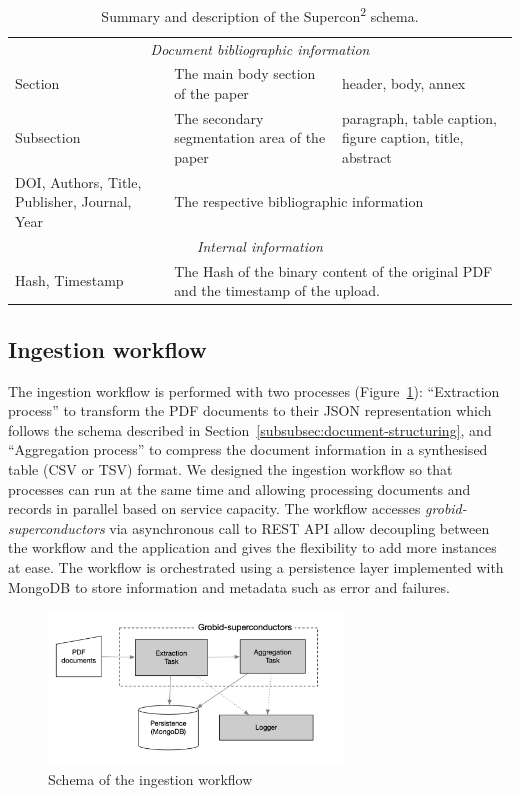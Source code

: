 \documentclass{article}
\begin{document}
\begin{table}[ht]
\begin{tabularx}{\linewidth}{p{}XX}
\multicolumn{3}{c}{\emph{Document bibliographic information}} \\
Section & The main body section of the paper& header, body, annex\\
Subsection & The secondary segmentation area of the paper& paragraph, table caption, figure caption, title, abstract \\
DOI, Authors, Title, Publisher, Journal, Year & \multicolumn{2}{l}{The respective bibliographic information}\\
\multicolumn{3}{c}{\emph{Internal information}} \\
Hash, Timestamp & \multicolumn{2}{l}{The Hash of the binary content of the original PDF and the timestamp of the upload.} 
\bottomrule
\end{tabularx}
\caption{\label{tab:supercon2-schema} Summary and description of the Supercon\textsuperscript{2} schema. }
\end{table}

\subsection{Ingestion workflow}
\label{subsec:ingestion-workflow}

The ingestion workflow is performed with two processes (Figure~\ref{fig:ingestion-workflow}): ``Extraction process'' to transform the PDF documents to their JSON representation which follows the schema described in Section~\ref{subsubsec:document-structuring}, and ``Aggregation process'' to compress the document information in a synthesised table (CSV or TSV) format.
We designed the ingestion workflow so that processes can run at the same time and allowing processing documents and records in parallel based on service capacity. 
The workflow accesses \textit{grobid-superconductors} via asynchronous call to REST API allow decoupling between the workflow and the application and gives the flexibility to add more instances at ease.
The workflow is orchestrated using a persistence layer implemented with MongoDB to store information and metadata such as error and failures.

\begin{figure}[ht]
\centering
\includegraphics[width=0.7\textwidth]{workflow-schema-1}
\caption{Schema of the ingestion workflow}
\label{fig:ingestion-workflow}
\end{figure}
\end{document}
